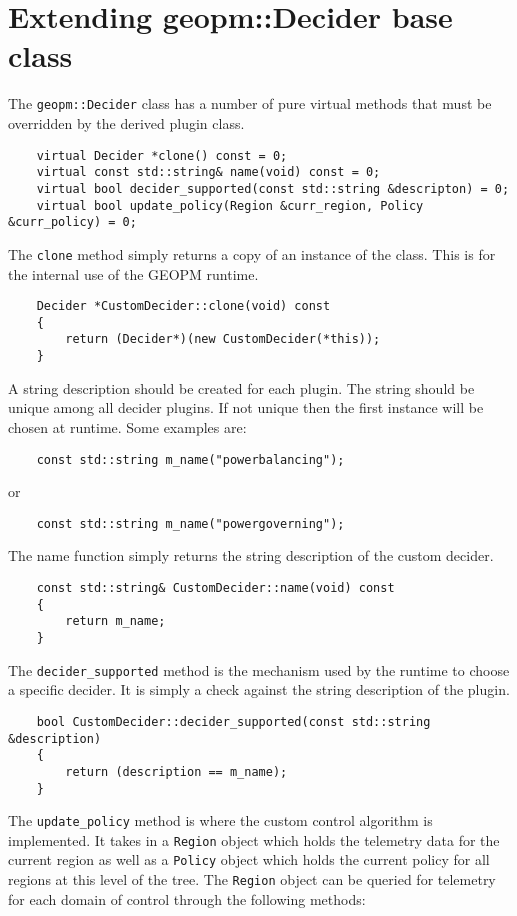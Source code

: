 \documentclass[11pt]{article}
\begin{document}
\section{Extending geopm::Decider base class}
The \verb#geopm::Decider# class has a number of pure virtual methods
that must be overridden by the derived plugin class.
\begin{verbatim}
    virtual Decider *clone() const = 0;
    virtual const std::string& name(void) const = 0;
    virtual bool decider_supported(const std::string &descripton) = 0;
    virtual bool update_policy(Region &curr_region, Policy &curr_policy) = 0;
\end{verbatim}
The \verb#clone# method simply returns a copy of an instance of the
class. This is for the internal use of the GEOPM runtime.
\begin{verbatim}
    Decider *CustomDecider::clone(void) const
    {
        return (Decider*)(new CustomDecider(*this));
    }
\end{verbatim}
A string description should be created for each plugin. The string
should be unique among all decider plugins. If not unique then the
first instance will be chosen at runtime. Some examples are:
\begin{verbatim}
    const std::string m_name("powerbalancing");
\end{verbatim}
or
\begin{verbatim}
    const std::string m_name("powergoverning");
\end{verbatim}
The name function simply returns the string description of the custom
decider.
\begin{verbatim}
    const std::string& CustomDecider::name(void) const
    {
        return m_name;
    }
\end{verbatim}
The \verb#decider_supported# method is the mechanism used by the
runtime to choose a specific decider. It is simply a check against the
string description of the plugin.
\begin{verbatim}
    bool CustomDecider::decider_supported(const std::string &description)
    {
        return (description == m_name);
    }
\end{verbatim}
The \verb#update_policy# method is where the custom control algorithm
is implemented. It takes in a \verb#Region# object which holds the
telemetry data for the current region as well as a \verb#Policy#
object which holds the current policy for all regions at this level of
the tree. The \verb#Region# object can be queried for telemetry for
each domain of control through the following methods:
\end{document}
